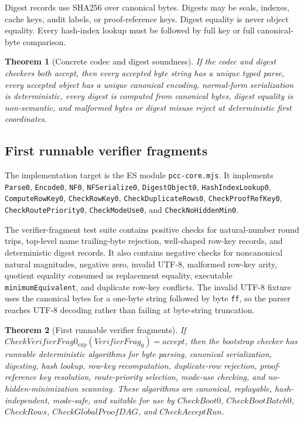 \documentclass[10.5pt,a4paper]{article}
\newtheorem{theorem}{Theorem}[section]
\begin{document}
Digest records use SHA256 over canonical bytes. Digests may be seals, indexes, cache keys, audit labels, or proof-reference keys. Digest equality is never object equality. Every hash-index lookup must be followed by full key or full canonical-byte comparison.

\begin{theorem}[Concrete codec and digest soundness]
If the codec and digest checkers both accept, then every accepted byte string has a unique typed parse, every accepted object has a unique canonical encoding, normal-form serialization is deterministic, every digest is computed from canonical bytes, digest equality is non-semantic, and malformed bytes or digest misuse reject at deterministic first coordinates.
\end{theorem}

\subsection{First runnable verifier fragments}
The implementation target is the ES module \texttt{pcc-core.mjs}. It implements \texttt{Parse0}, \texttt{Encode0}, \texttt{NF0}, \texttt{NFSerialize0}, \texttt{DigestObject0}, \texttt{HashIndexLookup0}, \texttt{ComputeRowKey0}, \texttt{CheckRowKey0}, \texttt{CheckDuplicateRows0}, \texttt{CheckProofRefKey0}, \texttt{CheckRoutePriority0}, \texttt{CheckModeUse0}, and \texttt{CheckNoHiddenMin0}.

The verifier-fragment test suite contains positive checks for natural-number round trips, top-level name trailing-byte rejection, well-shaped row-key records, and deterministic digest records. It also contains negative checks for noncanonical natural magnitudes, negative zero, invalid UTF-8, malformed row-key arity, quotient equality consumed as replacement equality, executable \texttt{minimumEquivalent}, and duplicate row-key conflicts. The invalid UTF-8 fixture uses the canonical bytes for a one-byte string followed by byte \texttt{ff}, so the parser reaches UTF-8 decoding rather than failing at byte-string truncation.

\begin{theorem}[First runnable verifier fragments]
If \(CheckVerifierFrag0_{\exp}(VerifierFrag_0)=accept\), then the bootstrap checker has runnable deterministic algorithms for byte parsing, canonical serialization, digesting, hash lookup, row-key recomputation, duplicate-row rejection, proof-reference key resolution, route-priority selection, mode-use checking, and no-hidden-minimization scanning. These algorithms are canonical, replayable, hash-independent, mode-safe, and suitable for use by \(CheckBoot0\), \(CheckBootBatch0\), \(CheckRows\), \(CheckGlobalProofDAG\), and \(CheckAcceptRun\).
\end{theorem}
\end{document}
